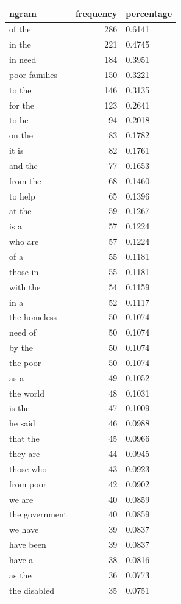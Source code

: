 \begin{tabular}{lrl}
\toprule
ngram & frequency & percentage \\
\midrule
of the & 286 & 0.6141 \\
in the & 221 & 0.4745 \\
in need & 184 & 0.3951 \\
poor families & 150 & 0.3221 \\
to the & 146 & 0.3135 \\
for the & 123 & 0.2641 \\
to be & 94 & 0.2018 \\
on the & 83 & 0.1782 \\
it is & 82 & 0.1761 \\
and the & 77 & 0.1653 \\
from the & 68 & 0.1460 \\
to help & 65 & 0.1396 \\
at the & 59 & 0.1267 \\
is a & 57 & 0.1224 \\
who are & 57 & 0.1224 \\
of a & 55 & 0.1181 \\
those in & 55 & 0.1181 \\
with the & 54 & 0.1159 \\
in a & 52 & 0.1117 \\
the homeless & 50 & 0.1074 \\
need of & 50 & 0.1074 \\
by the & 50 & 0.1074 \\
the poor & 50 & 0.1074 \\
as a & 49 & 0.1052 \\
the world & 48 & 0.1031 \\
is the & 47 & 0.1009 \\
he said & 46 & 0.0988 \\
that the & 45 & 0.0966 \\
they are & 44 & 0.0945 \\
those who & 43 & 0.0923 \\
from poor & 42 & 0.0902 \\
we are & 40 & 0.0859 \\
the government & 40 & 0.0859 \\
we have & 39 & 0.0837 \\
have been & 39 & 0.0837 \\
have a & 38 & 0.0816 \\
as the & 36 & 0.0773 \\
the disabled & 35 & 0.0751 \\

\end{tabular}
